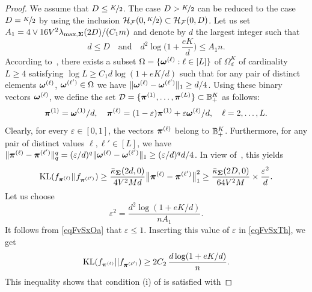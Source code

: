 \begin{proof}
	We assume that $D \leq \nicefrac{K}2$. The case $D> \nicefrac{K}2$ can be reduced to the
	case $D = \nicefrac{K}2$ by using the inclusion $\mathcal H_\mathcal F(0,\nicefrac{K}2)\subset \mathcal H_\mathcal F(0,D)$. Let us set $A_1 = 4\vee {16 V^2\lambda_{\max,\boldsymbol\Sigma}(2D)}/{(C_1 m)}$ 
	and denote by $d$ the largest integer such that
	\begin{equation}\label{eqFvSxOa}
	d\le D\quad\text{and}\quad d^2\log\Big(1+\frac{e  K}{d}\Big)\le A_1 n.
	\end{equation}
	According to~, there exists a subset
	$\Omega = \{\boldsymbol \omega^{(\ell)}:\ell\in[L]\}$ of  $\Omega_{d}^{K}$ of cardinality $L\ge 4$
	satisfying $\log L\geq {C_1 d}\log(1+{eK}/{d})$ such that for any pair of distinct 
	elements $\boldsymbol \omega^{(\ell)}$, $\boldsymbol \omega^{(\ell')}\in \Omega$ we have
	$\|\boldsymbol \omega^{(\ell)}-\boldsymbol \omega^{(\ell')}\|_1 \geq d/4$. Using these binary vectors $\boldsymbol \omega^{(\ell)}$, we define the set $\mathcal{D} =
	\{ \boldsymbol \pi^{(1)},\dots,\boldsymbol \pi^{(L)}\}\subset {\mathbb B}_+^{K}$ as follows:
	\begin{equation}\label{eqFvSxTw}
	\boldsymbol \pi^{(1)}=\boldsymbol \omega^{(1)}/d,\quad
	\boldsymbol \pi^{(\ell)}=(1-\varepsilon)\boldsymbol \pi^{(1)}+\varepsilon \boldsymbol \omega^{(\ell)}/d,\quad \ell=2,\ldots,L.
	\end{equation}
	Clearly, for every $\varepsilon\in[0,1]$, the vectors $\boldsymbol \pi^{(\ell)}$ belong to  ${\mathbb B}^K_+$.
	Furthermore, for any pair of distinct
	values $\ell,\ell'\in[L]$, we have $\|\boldsymbol \pi^{(\ell)}-\boldsymbol \pi^{(\ell')}\|_q^q = (\varepsilon/d)^q
	\|\boldsymbol \omega^{(\ell)}-\boldsymbol \omega^{(\ell')}\|_1\ge (\varepsilon/d)^qd/4$.  In view of~,
	this yields
	\begin{equation}\label{eqFvSxTh}
	{\rm KL}(f_{\boldsymbol \pi^{(\ell)}}||f_{\boldsymbol \pi^{(\ell')}})
	\geq \frac{\bar\kappa_{\boldsymbol\Sigma}(2d,0)}{4V^2M d} \big{\|}\boldsymbol \pi^{(\ell)} - \boldsymbol \pi^{(\ell')}\big{\|}_1^2
	\geq \frac{\bar\kappa_{\boldsymbol\Sigma}(2D,0)}{64V^2M}\times\frac{\varepsilon^2}{d}.
	\end{equation}
	Let us choose
	\begin{equation}
	\varepsilon^2 = \frac{d^2 \log(1+e  K/d)}{n A_1}.
	\end{equation}
	It follows from \eqref{eqFvSxOa} that $\varepsilon\le 1$. Inserting this value of
	$\varepsilon$ in \eqref{eqFvSxTh}, we get
	\begin{equation}
	{\rm KL}(f_{\boldsymbol \pi^{(\ell)}}||f_{\boldsymbol \pi^{(\ell')}}) \geq 2 C_2\,\frac{d\log(1+e  K/d)}{n}.
	\end{equation}
	This inequality shows that condition (i) of  is satisfied with

\end{proof}
